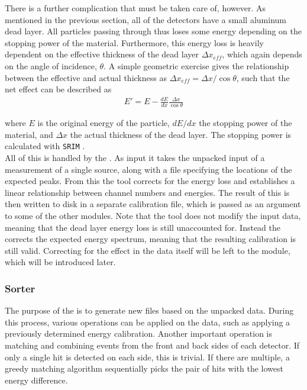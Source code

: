 There is a further complication that must be taken care of, however. As mentioned in the previous section, all of the detectors have a small aluminum dead layer. All particles passing through thus loses some energy depending on the stopping power of the material. Furthermore, this energy loss is heavily dependent on the effective thickness of the dead layer $\Delta x_{eff}$, which again depends on the angle of incidence, $\theta$. A simple geometric exercise gives the relationship between the effective and actual thickness as $\Delta x_{eff} = \Delta x / \cos \theta$, such that the net effect can be described as
\begin{align}
E' = E - \frac{dE}{dx} \frac{\Delta x}{\cos \theta}
\end{align}

where $E$ is the original energy of the particle, $dE/dx$ the stopping power of the material, and $\Delta x$ the actual thickness of the dead layer. The stopping power is calculated with \texttt{SRIM} \cite{SRIM}. \\

All of this is handled by the \Calibrator{}. As input it takes the unpacked input of a measurement of a single source, along with a file specifying the locations of the expected peaks. From this the tool corrects for the energy loss and establishes a linear relationship between channel numbers and energies. The result of this is then written to disk in a separate calibration file, which is passed as an argument to some of the other modules. Note that the tool does not modify the input data, meaning that the dead layer energy loss is still unaccounted for. Instead the \Calibrator{} corrects the expected energy spectrum, meaning that the resulting calibration is still valid. Correcting for the effect in the data itself will be left to the \Identifier{} module, which will be introduced later.

\subsubsection{Sorter}
The purpose of the \Sorter{} is to generate new \ROOT{} files based on the unpacked data. During this process, various operations can be applied on the data, such as applying a previously determined energy calibration. Another important operation is matching and combining events from the front and back sides of each detector. If only a single hit is detected on each side, this is trivial. If there are multiple, a greedy matching algorithm sequentially picks the pair of hits with the lowest energy difference. \\

